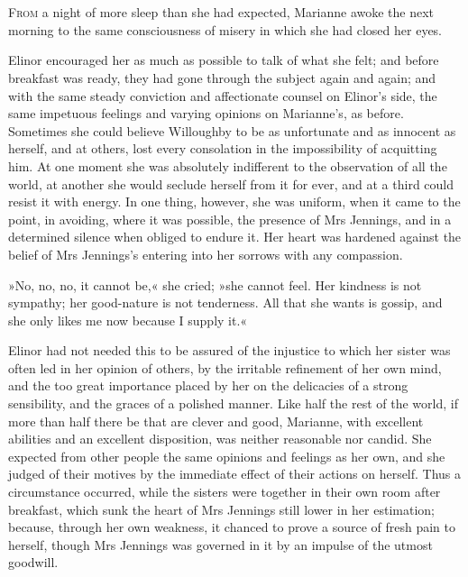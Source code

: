 \chapter[Chapter \thechapter]{}
\lettrine[lines=4,lraise=0.3]{F}{rom} a night of more sleep than she had expected, Marianne awoke the next morning to the same consciousness of misery in which she had closed her eyes.

\zz
Elinor encouraged her as much as possible to talk of what she felt; and before breakfast was ready, they had gone through the subject again and again; and with the same steady conviction and affectionate counsel on Elinor’s side, the same impetuous feelings and varying opinions on Marianne’s, as before. Sometimes she could believe Willoughby to be as unfortunate and as innocent as herself, and at others, lost every consolation in the impossibility of acquitting him. At one moment she was absolutely indifferent to the observation of all the world, at another she would seclude herself from it for ever, and at a third could resist it with energy. In one thing, however, she was uniform, when it came to the point, in avoiding, where it was possible, the presence of Mrs Jennings, and in a determined silence when obliged to endure it. Her heart was hardened against the belief of Mrs Jennings’s entering into her sorrows with any compassion.

»No, no, no, it cannot be,« she cried; »she cannot feel. Her kindness is not sympathy; her good-nature is not tenderness. All that she wants is gossip, and she only likes me now because I supply it.«

Elinor had not needed this to be assured of the injustice to which her sister was often led in her opinion of others, by the irritable refinement of her own mind, and the too great importance placed by her on the delicacies of a strong sensibility, and the graces of a polished manner. Like half the rest of the world, if more than half there be that are clever and good, Marianne, with excellent abilities and an excellent disposition, was neither reasonable nor candid. She expected from other people the same opinions and feelings as her own, and she judged of their motives by the immediate effect of their actions on herself. Thus a circumstance occurred, while the sisters were together in their own room after breakfast, which sunk the heart of Mrs Jennings still lower in her estimation; because, through her own weakness, it chanced to prove a source of fresh pain to herself, though Mrs Jennings was governed in it by an impulse of the utmost goodwill.

